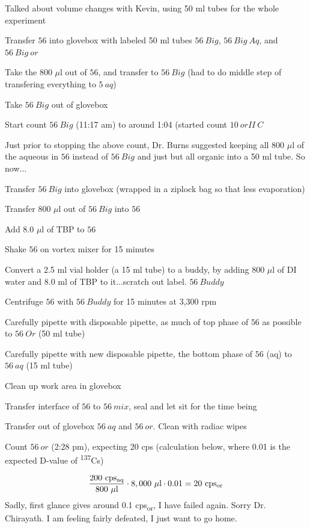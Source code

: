 \documentclass[idxtotoc,hyperref,openany,oneside]{labbook} %
\newcommand{\cmark}{\ding{51}}%
\newcommand{\done}{\rlap{$\square$}{\raisebox{2pt}{\large\hspace{1pt}\cmark}}%
  \hspace{-2.5pt}}
\newcommand{\tss}{\textsuperscript}
\newcommand{\tsbs}{\textsubscript}
\begin{document}
Talked about volume changes with Kevin, using 50 ml tubes
for the whole experiment
\begin{todolist}
\item[\done]{Transfer $\boxed{56}$ into glovebox with labeled
  50 ml tubes $\boxed{56\ Big}$, $\boxed{56\ Big\ Aq}$,
  and $\boxed{56\ Big\ or}$}
\item[\done]{Take the 800 $\mu$l out of $\boxed{56}$, and
  transfer to $\boxed{56\ Big}$ (had to do middle step of
  transfering everything to $\boxed{5 \ aq}$)}
\item[\done]{Take $\boxed{56\ Big}$ out of glovebox}
\item[\done]{Start count $\boxed{56\ Big}$ (11:17 am) to
             around 1:04 (started count $\boxed{10\ orII\ C}$}
\end{todolist}
Just prior to stopping the above count, Dr. Burns suggested
keeping all 800 $\mu$l of the aqueous in $\boxed{56}$ instead
of $\boxed{56\ Big}$ and just but all organic into a 50 ml tube.
So now...
\begin{todolist}
\item[\done]{Transfer $\boxed{56\ Big}$ into glovebox (wrapped
  in a ziplock bag so that less evaporation)}
\item[\done]{Transfer 800 $\mu$l out of $\boxed{56\ Big}$ into
  $\boxed{56}$}
\item[\done]{Add 8.0 $\mu$l of TBP to $\boxed{56}$}
\item[\done]{Shake $\boxed{56}$ on vortex mixer for 15 minutes}
\item[\done]{Convert a 2.5 ml vial holder (a 15 ml tube) to a
  buddy, by adding 800 $\mu$l of DI water and 8.0 ml of TBP
  to it...scratch out label. $\boxed{56\ Buddy}$}
\item[\done]{Centrifuge $\boxed{56}$ with $\boxed{56\ Buddy}$
  for 15 minutes at 3,300 rpm}
\item[\done]{Carefully pipette with disposable pipette,
  as much of top phase of $\boxed{56}$ as possible to
  $\boxed{56\ Or}$ (50 ml tube)}
\item[\done]{Carefully pipette with new disposable pipette,
  the bottom phase of $\boxed{56}$ (aq) to $\boxed{56\ aq}$ (15 ml tube)}
\item[\done]{Clean up work area in glovebox}
\item[\done]{Transfer interface of $\boxed{56}$ to $\boxed{56\ mix}$,
  seal and let sit for the time being}
\item[\done]{Transfer out of glovebox
  $\boxed{56\ aq}$ and $\boxed{56\ or}$. Clean with radiac wipes}
\item[\done]{Count $\boxed{56\ or}$ (2:28 pm),
  expecting 20 cps (calculation below,
  where 0.01 is the expected D-value of \tss{137}Cs)}
\end{todolist}
\begin{align*}
  \frac{200\ \text{cps\tsbs{aq}}}{800\ \mu\text{l}}\cdot8,000\ \mu\text{l}
  \cdot0.01=20\ \text{cps\tsbs{or}}
\end{align*}
Sadly, first glance gives around 0.1 cps\tsbs{or}, I have failed again.
Sorry Dr. Chirayath. I am feeling fairly defeated, I just want to go home.
\end{document}
